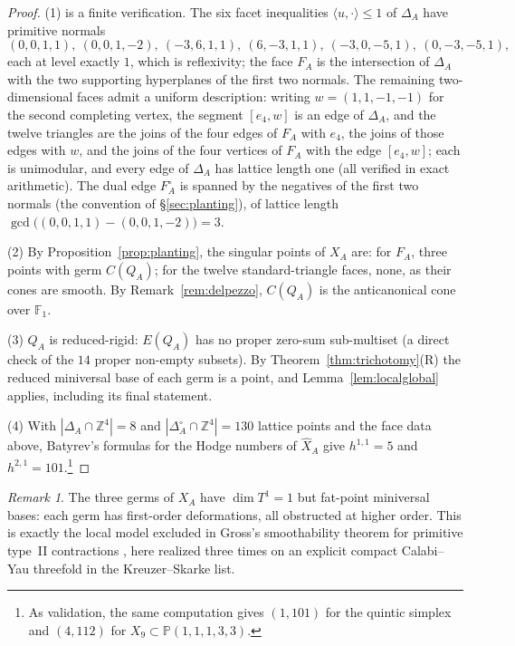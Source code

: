 \documentclass[11pt]{amsart}
\theoremstyle{definition}
\theoremstyle{remark}
\newtheorem{remark}[theorem]{Remark}
\newcommand{\ZZ}{\mathbb{Z}}
\newcommand{\PP}{\mathbb{P}}
\newcommand{\FF}{\mathbb{F}}
\begin{document}
\begin{proof}
(1) is a finite verification.  The six facet inequalities
$\langle u, \cdot\rangle \le 1$ of $\Delta_A$ have primitive normals
\[
(0,0,1,1),\ (0,0,1,-2),\ (-3,6,1,1),\ (6,-3,1,1),\ (-3,0,-5,1),\
(0,-3,-5,1),
\]
each at level exactly $1$, which is reflexivity; the face $F_A$ is the
intersection of $\Delta_A$ with the two supporting hyperplanes of the first
two normals.  The remaining two-dimensional faces admit a uniform
description: writing $w=(1,1,-1,-1)$ for the second completing vertex, the
segment $[e_4,w]$ is an edge of $\Delta_A$, and the twelve triangles are the
joins of the four edges of $F_A$ with $e_4$, the joins of those edges with
$w$, and the joins of the four vertices of $F_A$ with the edge $[e_4,w]$;
each is unimodular, and every edge of $\Delta_A$ has lattice length one
(all verified in exact arithmetic).  The dual edge $F_A^\circ$ is spanned by the negatives
of the first two normals (the convention of \S\ref{sec:planting}), of lattice
length $\gcd\bigl((0,0,1,1)-(0,0,1,-2)\bigr)=3$.

(2) By Proposition~\ref{prop:planting}, the singular points of $X_A$ are: for
$F_A$, three points with germ $C(Q_A)$; for the twelve standard-triangle
faces, none, as their cones are smooth.  By Remark~\ref{rem:delpezzo},
$C(Q_A)$ is the anticanonical cone over $\FF_1$.

(3) $Q_A$ is reduced-rigid: $E(Q_A)$ has no proper zero-sum sub-multiset (a direct
check of the $14$ proper non-empty subsets).  By
Theorem~\ref{thm:trichotomy}(R) the reduced miniversal base of each germ is a
point, and Lemma~\ref{lem:localglobal} applies, including its final statement.

(4) With $|\Delta_A\cap\ZZ^4|=8$ and $|\Delta_A^\circ\cap\ZZ^4|=130$ lattice
points and
the face data above, Batyrev's formulas \cite{Batyrev94} for the Hodge numbers
of $\widehat X_A$ give $h^{1,1}=5$ and $h^{2,1}=101$.\footnote{As
validation, the same computation gives $(1,101)$ for the quintic simplex
and $(4,112)$ for $X_9\subset\PP(1,1,1,3,3)$.}
\end{proof}

\begin{remark}
The three germs of $X_A$ have $\dim T^1 = 1$ but fat-point miniversal bases:
each germ has first-order deformations, all obstructed at higher order.
This is exactly the local model excluded in Gross's smoothability theorem for
primitive type~II contractions \cite[Theorem~5.8, \S5.5]{Gross97}, here
realized three times on an explicit compact Calabi--Yau threefold in the
Kreuzer--Skarke list.
\end{remark}
\end{document}
